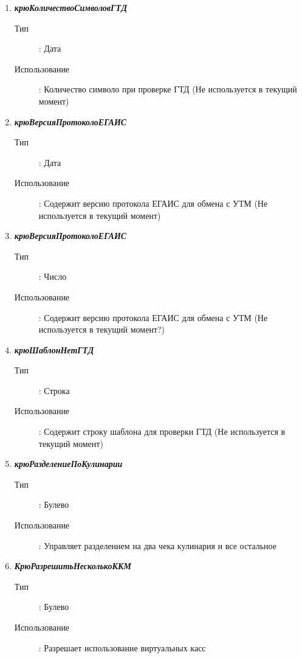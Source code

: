 \begin{enumerate}[label=(\arabic*)]
\vspace{\baselineskip}
\item \textbf{\textit{крюКоличествоСимволовГТД}}
\begin{description}
    \item[Тип] : Дата
    \item[Использование]: Количество символо при проверке ГТД (Не используется в текущий момент)
\end{description}

\vspace{\baselineskip}
\item \textbf{\textit{крюВерсияПротоколоЕГАИС}}
\begin{description}
    \item[Тип] : Дата
    \item[Использование]: Содержит версию протокола ЕГАИС для обмена с УТМ (Не используется в текущий момент)
\end{description}

\vspace{\baselineskip}
\item \textbf{\textit{крюВерсияПротоколоЕГАИС}}
\begin{description}
    \item[Тип] : Число
    \item[Использование]: Содержит версию протокола ЕГАИС для обмена с УТМ (Не используется в текущий момент?)
\end{description}

\vspace{\baselineskip}
\item \textbf{\textit{крюШаблонНетГТД}}
\begin{description}
    \item[Тип] : Строка
    \item[Использование]: Содержит строку шаблона для проверки ГТД (Не используется в текущий момент)
\end{description}

\vspace{\baselineskip}
\item \textbf{\textit{крюРазделениеПоКулинарии}}
\begin{description}
    \item[Тип] : Булево
    \item[Использование]: Управляет разделением на два чека кулинария и все остальное
\end{description}

\vspace{\baselineskip}
\item \textbf{\textit{КрюРазрешитьНесколькоККМ}}
\begin{description}
    \item[Тип] : Булево
    \item[Использование]: Разрешает использование виртуальных касс
\end{description}


\end{enumerate}
